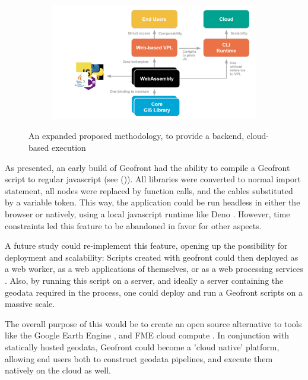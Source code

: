 \begin{figure}
  \centering
  \begin{subfigure}[b]{0.80\linewidth}
    \centering
    \graphicspath{{../../assets/images/1/}}
    \includegraphics[width=\linewidth]{expanded-proposal.png}
  \end{subfigure}%
  \caption{An expanded proposed methodology, to provide a backend, cloud-based execution}
  \label{fig:proposal-extended-again}
\end{figure}

As presented, an early build of Geofront had the ability to compile a Geofront script to regular javascript (see ()).  
All libraries were converted to normal import statement, all nodes were replaced by function calls, and the cables substituted by a variable token. 
This way, the application could be run headless in either the browser or natively, using a local javascript runtime like Deno \citep{contributors_deno_2022}.
However, time constraints led this feature to be abandoned in favor for other aspects.

A future study could re-implement this feature, opening up the possibility for deployment and scalability: 
Scripts created with geofront could then deployed as a web worker, as a web applications of themselves, or as a web processing services \citep{open_geospatial_consortium_web_2015}.
Also, by running this script on a server, and ideally a server containing the geodata required in the process, one could deploy and run a Geofront scripts on a massive scale. 

The overall purpose of this would be to create an open source alternative to tools like the Google Earth Engine \citep{google_google_2022}, and FME cloud compute \citep{safe-software_fme_2022-1}. 
In conjunction with statically hosted geodata, Geofront could become a 'cloud native' platform, allowing end users both to construct geodata pipelines, and execute them natively on the cloud as well.

